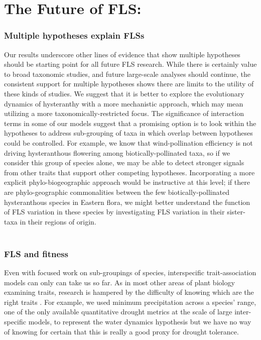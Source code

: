 \documentclass{article}
\begin{document}
\section*{The Future of FLS:}
\subsubsection*{Multiple hypotheses explain FLSs}

\indent\indent Our results underscore other lines of evidence that show multiple hypotheses should be starting point for all future FLS research. While there is certainly value to broad taxonomic studies, and future large-scale analyses should continue, the consistent support for multiple hypotheses shows there are limits to the utility of these kinds of studies. We suggest that it is better to explore the evolutionary dynamics of hysteranthy with a more mechanistic approach, which may mean utilizing a more taxonomically-restricted focus. The significance of interaction terms in some of our models suggest that a promising option is to look within the hypotheses to address sub-grouping of taxa in which overlap between hypotheses could be controlled. For example, we know that wind-pollination efficiency is not driving hysteranthous flowering among biotically-pollinated taxa, so if we consider this group of species alone, we may be able to detect stronger signals from other traits that support other competing hypotheses. Incorporating a more explicit phylo-biogeographic approach would be instructive at this level; if there are phylo-geographic commonalities between the few biotically-pollinated hysteranthous species in Eastern flora, we might better understand the function of FLS variation in these species by investigating FLS variation in their sister-taxa in their regions of origin.\\ 

\subsubsection*{FLS and fitness}
Even with focused work on sub-groupings of species, interspecific trait-association models can only can take us so far. As in most other areas of plant biology examining traits, research is hampered by the difficulty of knowing which are the right traits \citep{}. For example, we used minimum precipitation across a species' range, one of the only available quantitative drought metrics at the scale of large inter-specific models, to represent the water dynamics hypothesis but we have no way of knowing for certain that this is really a good proxy for drought tolerance. \\
\end{document}
